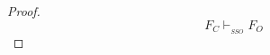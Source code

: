 \documentclass[conference,compsocconf]{IEEEtran}
\begin{document}
\begin{proof}
	 \begin{equation}\label{SSOEND}
          F_C \vdash_{_{SSO}} F_O
         \end{equation}



\end{proof}
\end{document}
